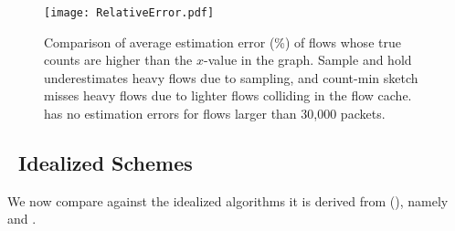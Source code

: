%

\begin{figure}[h]
\texttt{[image: RelativeError.pdf]}
\caption{Comparison of average estimation error (\%) of flows whose true counts
  are higher than the $x$-value in the graph. Sample and hold underestimates
  heavy flows due to sampling, and count-min sketch misses heavy flows due to
  lighter flows colliding in the flow cache. \TheSystem has no estimation errors for
  flows larger than 30,000 packets.}
\label{fig:relative-error}
\end{figure}


\subsection{\TheSystem\ \vs Idealized Schemes}\label{subsec:comparisonIdeal}

We now compare \TheSystem against the idealized algorithms it is derived from
(), namely \spacesaving~\cite{metwally2005efficient} and
\Baseline.

